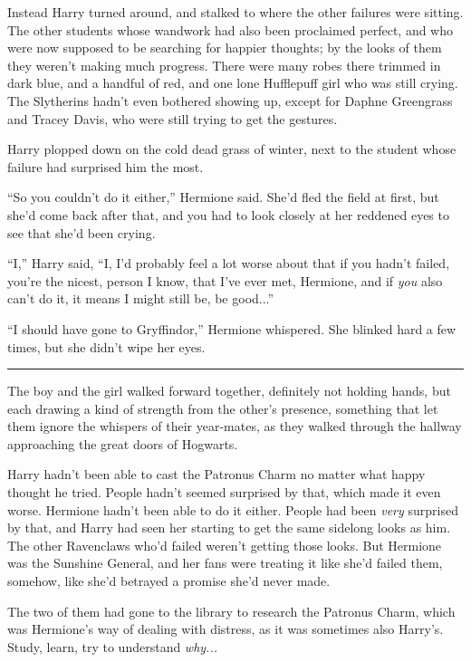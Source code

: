 Instead Harry turned around, and stalked to where the other failures were sitting. The other students whose wandwork had also been proclaimed perfect, and who were now supposed to be searching for happier thoughts; by the looks of them they weren't making much progress. There were many robes there trimmed in dark blue, and a handful of red, and one lone Hufflepuff girl who was still crying. The Slytherins hadn't even bothered showing up, except for Daphne Greengrass and Tracey Davis, who were still trying to get the gestures.

Harry plopped down on the cold dead grass of winter, next to the student whose failure had surprised him the most.

``So you couldn't do it either,'' Hermione said. She'd fled the field at first, but she'd come back after that, and you had to look closely at her reddened eyes to see that she'd been crying.

``I,'' Harry said, ``I, I'd probably feel a lot worse about that if you hadn't failed, you're the nicest, person I know, that I've ever met, Hermione, and if \emph{you} also can't do it, it means I might still be, be good...''

``I should have gone to Gryffindor,'' Hermione whispered. She blinked hard a few times, but she didn't wipe her eyes.

\begin{center}\rule{3in}{0.4pt}\end{center}

The boy and the girl walked forward together, definitely not holding hands, but each drawing a kind of strength from the other's presence, something that let them ignore the whispers of their year-mates, as they walked through the hallway approaching the great doors of Hogwarts.

Harry hadn't been able to cast the Patronus Charm no matter what happy thought he tried. People hadn't seemed surprised by that, which made it even worse. Hermione hadn't been able to do it either. People had been \emph{very} surprised by that, and Harry had seen her starting to get the same sidelong looks as him. The other Ravenclaws who'd failed weren't getting those looks. But Hermione was the Sunshine General, and her fans were treating it like she'd failed them, somehow, like she'd betrayed a promise she'd never made.

The two of them had gone to the library to research the Patronus Charm, which was Hermione's way of dealing with distress, as it was sometimes also Harry's. Study, learn, try to understand \emph{why...}

